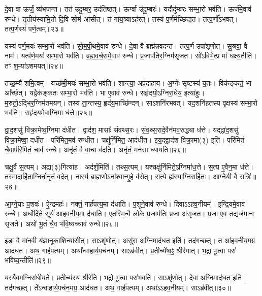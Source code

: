 दे॒वा वा ऊर्जं॒ व्य॑भजन्त।
तत॑ उदु॒म्बर॒ उद॑तिष्ठत्।
ऊर्ग्वा उ॑दु॒म्बरः॑।
यदौदु॑म्बरः सम्भा॒रो भव॑ति।
ऊर्ज॑मे॒वाव॑ रुन्धे।
तृ॒तीय॑स्यामि॒तो दि॒वि सोम॑ आसीत्।
तं गा॑य॒त्र्या\-ऽह॑रत्।
तस्य॑ प॒र्णम॑च्छिद्यत।
तत्प॒र्णो॑\-ऽभवत्।
तत्प॒र्णस्य॑ पर्ण॒त्वम्॥२३॥\ip

यस्य॑ पर्ण॒मयः॑ सम्भा॒रो भव॑ति।
सो॒म॒पी॒थमे॒वाव॑ रुन्धे।
दे॒वा वै ब्रह्म॑न्नवदन्त।
तत्प॒र्ण उपा॑शृणोत्।
सु॒श्रवा॒ वै नाम॑।
यत्प॑र्ण॒मयः॑ सम्भा॒रो भव॑ति।
ब्र॒ह्म॒व॒र्च॒समे॒वाव॑ रुन्धे।
प्र॒जा\-प॑तिर॒ग्निम॑\-सृजत।
सो॑ऽबिभे॒त्प्र मा॑ धक्ष्य॒तीति॑।
तꣳ श॒म्या॑\-ऽशमयत्॥२४॥\ip

तच्छ॒म्यै॑ शमि॒त्वम्।
यच्छ॑मी॒मयः॑ सम्भा॒रो भव॑ति।
शान्त्या॒ अप्र॑दाहाय।
अ॒ग्नेः सृ॒ष्टस्य॑ य॒तः।
विक॑ङ्कतं॒ भा आ᳚र्च्छत्।
यद्वैक॑ङ्कतः सम्भा॒रो भव॑ति।
भा ए॒वाव॑ रुन्धे।
सहृ॑दयो॒\-ऽग्निरा॒धेय॒ इत्या॑हुः।
म॒रुतो॒\-ऽद्भिर॒ग्निम॑तमयन्।
तस्य॑ ता॒न्तस्य॒ हृद॑य॒माच्छि॑न्दन्।
साऽशनि॑रभवत्।
यद॒शनि॑हतस्य वृ॒क्षस्य॑ सम्भा॒रो भव॑ति।
सहृ॑दयमे॒वाग्निमा ध॑त्ते॥२५॥\ip{}

द्वा॒द॒शसु॑ विक्रा॒मेष्व॒ग्निमा द॑धीत।
द्वाद॑श॒ मासाः᳚ संवथ्स॒रः।
सं॒व॒थ्स॒रादे॒वैन॑मव॒रुद्ध्या ध॑त्ते।
यद्द्वा॑द॒शसु॑ विक्रा॒मेष्वा॒ दधी॑त।
परि॑मित॒मव॑ रुन्धीत।
चक्षु॑र्निमित॒ आद॑धीत।
इय॒द्द्वाद॑श विक्रा॒मा(३) इति॑।
परि॑मितं चै॒वाप॑रिमितं॒ चाव॑ रुन्धे।
अनृ॑तं॒ वै वा॒चा व॑दति।
अनृ॑तं॒ मन॑सा ध्यायति॥२६॥\ip

चक्षु॒र्वै स॒त्यम्।
अद्रा(३)गित्या॑ह।
अद॑र्\mbox{}श॒मिति॑।
तथ्स॒त्यम्।
यश्चक्षु॑र्निमिते॒\-ऽग्निमा॑ध॒त्ते।
स॒त्य ए॒वैन॒मा ध॑त्ते।
तस्मा॒दाहि॑ताग्नि॒र्नानृ॑तं वदेत्।
नास्य॑ ब्राह्म॒णो\-ऽना᳚श्वान्गृ॒हे व॑सेत्।
स॒त्ये ह्य॑स्या॒ग्निराहि॑तः।
आ॒ग्ने॒यी वै रात्रिः॑॥२७॥\ip

आ॒ग्ने॒याः प॒शवः॑।
ऐ॒न्द्रमहः॑।
नक्तं॒ गार्\mbox{}ह॑पत्य॒मा द॑धाति।
प॒शूने॒वाव॑ रुन्धे।
दिवा॑ऽऽहव॒नीयम्᳚।
इ॒न्द्रि॒यमे॒वाव॑ रुन्धे।
अ॒र्धोदि॑ते॒ सूर्य॑ आहव॒नीय॒मा द॑धाति।
ए॒तस्मि॒न्वै लो॒के प्र॒जा\-प॑तिः प्र॒जा अ॑\-सृजत।
प्र॒जा ए॒व तद्यज॑मानः \-सृजते।
अथो॑ भू॒तं चै॒व भ॑वि॒ष्यच्चाव॑ रुन्धे॥२८॥\ip

इडा॒ वै मा॑न॒वी य॑ज्ञानूका॒शिन्या॑सीत्।
साऽशृ॑णोत्।
असु॑रा अ॒ग्निमाद॑धत॒ इति॑।
तद॑गच्छत्।
त आ॑हव॒नीय॒मग्र॒ आद॑धत।
अथ॒ गार्\mbox{}ह॑पत्यम्।
अथा᳚न्वाहार्य॒पच॑नम्।
साऽब्र॑वीत्।
प्र॒तीच्ये॑षा॒ꣴ॒ श्रीर॑गात्।
भ॒द्रा भू॒त्वा परा॑ भविष्य॒न्तीति॑॥२९॥\ip

यस्यै॒वम॒ग्निरा॑धी॒यते᳚।
प्र॒तीच्य॑स्य॒ श्रीरे॑ति।
भ॒द्रो भू॒त्वा परा॑भवति।
साऽशृ॑णोत्।
दे॒वा अ॒ग्निमाद॑धत॒ इति॑।
तद॑गच्छत्।
ते᳚ऽन्वाहार्य॒पच॑न॒मग्र॒ आद॑धत।
अथ॒ गार्\mbox{}ह॑पत्यम्।
अथा॑ऽऽहव॒नी\-यम्᳚।
साऽब्र॑वीत्॥३०॥\ip

